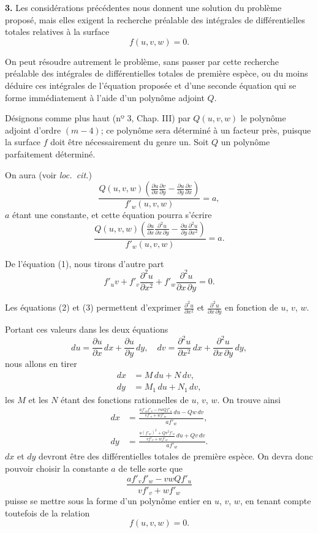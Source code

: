 \documentclass{article}
\begin{document}
\textbf{3.} Les considérations précédentes nous donnent une solution du problème proposé, mais elles exigent la recherche préalable des intégrales de différentielles totales relatives à la surface
\[
f(u, v, w) = 0. \tag{1}
\]

On peut résoudre autrement le problème, sans passer par cette recherche préalable des intégrales de différentielles totales de première espèce, ou du moins déduire ces intégrales de l'équation proposée et d'une seconde équation qui se forme immédiatement à l'aide d'un polynôme adjoint $Q$.

Désignons comme plus haut (nº 3, Chap. III) par $Q(u, v, w)$ le polynôme adjoint d'ordre $(m - 4)$; ce polynôme sera déterminé à un facteur près, puisque la surface $f$ doit être nécessairement du genre un. Soit $Q$ un polynôme parfaitement déterminé.


On aura (voir \emph{loc.\ cit.})
\[
\frac{Q(u, v, w)\left( \frac{\partial u}{\partial x} \frac{\partial v}{\partial y} - \frac{\partial u}{\partial y} \frac{\partial v}{\partial x} \right)}{f'_{w}(u, v, w)} = a,
\]
$a$ étant une constante, et cette équation pourra s'écrire
\[
\frac{Q(u, v, w)\left( \frac{\partial u}{\partial x} \frac{\partial^{2} u}{\partial x\,\partial y} - \frac{\partial u}{\partial y} \frac{\partial^{2} u}{\partial x^{2}} \right)}{f'_{w}(u, v, w)} = a. \tag{2}
\]

De l'équation (1), nous tirons d'autre part
\[
f'_{u} v + f'_{v}\frac{\partial^{2} u}{\partial x^{2}} + f'_{w}\frac{\partial^{2} u}{\partial x\,\partial y} = 0. \tag{3}
\]

Les équations (2) et (3) permettent d'exprimer $\frac{\partial^{2} u}{\partial x^{2}}$ et $\frac{\partial^{2} u}{\partial x\,\partial y}$ en fonction de $u$, $v$, $w$.

Portant ces valeurs dans les deux équations
\[
du = \frac{\partial u}{\partial x}\,dx + \frac{\partial u}{\partial y}\,dy, \quad dv = \frac{\partial^{2} u}{\partial x^{2}}\,dx + \frac{\partial^{2} u}{\partial x\,\partial y}\,dy,
\]
nous allons en tirer
\[
\begin{aligned}
dx &= M\,du + N\,dv, \\
dy &= M_{1}\,du + N_{1}\,dv,
\end{aligned}
\]
les $M$ et les $N$ étant des fonctions rationnelles de $u$, $v$, $w$. On trouve ainsi
\[
\begin{aligned}
dx &= \frac{\frac{a f'_{w} f'_{v} - v w Q f'_{u}}{v f'_{v} + w f'_{w}}\,du - Q w\,dv}{a f'_{w}}, \\
dy &= \frac{\frac{a (f'_{w})^{2} + Q v^{2} f'_{u}}{v f'_{v} + w f'_{w}}\,du + Q v\,dv}{a f'_{w}}.
\end{aligned}
\]
$dx$ et $dy$ devront être des différentielles totales de première espèce. On devra donc pouvoir choisir la constante $a$ de telle sorte que
\[
\frac{a f'_{v} f'_{w} - v w Q f'_{u}}{v f'_{v} + w f'_{w}} \tag{4}
\]
puisse se mettre sous la forme d'un polynôme entier en $u$, $v$, $w$, en tenant compte toutefois de la relation
\[
f(u, v, w) = 0.
\]
\end{document}
